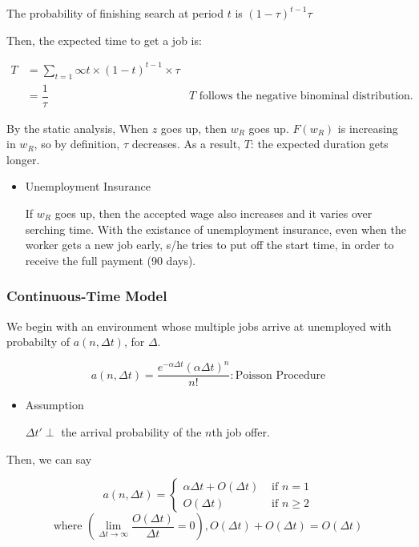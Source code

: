 \documentclass[dvipdfmx, 12pt]{article}
\begin{document}
The probability of finishing search at period $t$ is $(1-\tau)^{t-1} \tau$

Then, the expected time to get a job is:

\begin{align*}
  T &= \sum_{t=1}{\infty} t \times (1 - t)^{t-1} \times \tau \\
  &= \dfrac{1}{\tau}
  & T \text{ follows the negative binominal distribution.}
\end{align*}

By the static analysis, When $z$ goes up, then $w_R$ goes up. $F(w_R)$ is increasing in $w_R$, so by definition, $\tau$ decreases. As a result, $T$: the expected duration gets longer.

\begin{itemize}
  \item Unemployment Insurance

  If $w_R$ goes up, then the accepted wage also increases and it varies over serching time. With the existance of unemployment insurance, even when the worker gets a new job early, s/he tries to put off the start time, in order to receive the full payment (90 days).
\end{itemize}

\subsubsection{Continuous-Time Model}

We begin with an environment whose multiple jobs arrive at unemployed with probabilty of $a(n, \Delta t)$, for $\Delta$.

\[
a(n, \Delta t) = \dfrac{e^{- \alpha \Delta t} (\alpha \Delta t)^n}{n!}: \text{Poisson Procedure}
\]

\begin{itemize}
  \item Assumption

  $\Delta t'\perp$ the arrival probability of the $n$th job offer.
\end{itemize}

Then, we can say

\[
a(n, \Delta t) = \begin{cases}
  \alpha \Delta t + O(\Delta t) & \text{ if }n = 1 \\
  O(\Delta t) & \text{ if }n \geq 2
\end{cases}
\]
\[
\text{where } \left( \lim_{\Delta t \to \infty} \dfrac{O(\Delta t)}{\Delta t} = 0 \right), O(\Delta t) + O(\Delta t) = O(\Delta t)
\]
\end{document}
